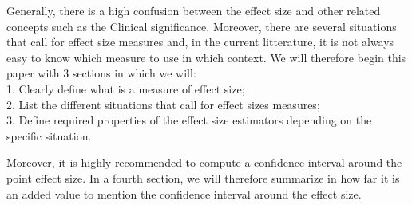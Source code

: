 \documentclass[
  man,floatsintext]{apa6}
\begin{document}
Generally, there is a high confusion between the effect size and other related concepts such as the Clinical significance. Moreover, there are several situations that call for effect size measures and, in the current litterature, it is not always easy to know which measure to use in which context. We will therefore begin this paper with 3 sections in which we will:\\
1. Clearly define what is a measure of effect size;\\
2. List the different situations that call for effect sizes measures;\\
3. Define required properties of the effect size estimators depending on the specific situation.

Moreover, it is highly recommended to compute a confidence interval around the point effect size. In a fourth section, we will therefore summarize in how far it is an added value to mention the confidence interval around the effect size.
\end{document}
